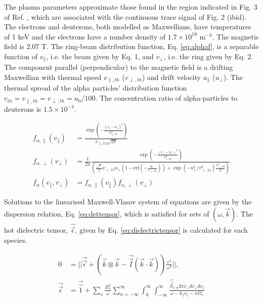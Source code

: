 \documentclass[12pt]{iopart}
\begin{document}
The plasma parameters approximate those found in the region indicated in Fig. 3 of Ref. \cite{Cottrell1993}, which are associated with the continuous trace signal of Fig. 2 (ibid). The electrons and deuterons, both modelled as Maxwellians, have temperatures of 1 keV and the electrons have a number density of $1.7\times 10^{19}$ $\mathrm{m^{-3}}$. The magnetic field is $2.07$ $\mathrm{T}$.
The ring-beam distribution function, Eq. \ref{eq:alphaf}, is a separable function of $v_\parallel$, i.e. the beam given by Eq. 1, and $v_\perp$, i.e. the ring given by Eq. 2. The component parallel (perpendicular) to the magnetic field is a drifting Maxwellian with thermal speed $v_{\parallel, th}$ ($v_{\perp, th}$) and drift velocity $u_\parallel$ ($u_\perp$). The thermal spread of the alpha particles' distribution function $v_{th}=v_{\parallel,th}=v_{\perp,th}=u_0/100$. The concentration ratio of alpha-particles to deuterons is $1.5\times10^{-4}$.

\begin{align}
f_{\alpha,\parallel}\left(v_\parallel\right) &= \frac{\exp\left(-\frac{(v_\parallel - u_\parallel)^2}{v_{\parallel,th}^2}\right)}{v_{\parallel,th} \sqrt{2 \pi}}\\
f_{\alpha,\perp}\left(v_\perp\right) &= \frac{1}{2\pi}\frac{\exp\left(-\frac{\left(v_\bot - u_\bot\right)^2}{v_{\bot,th}^2}\right)}{\left(\frac{\sqrt \pi}{2} v_{\perp, th} u_\bot (1 - \mathrm{erf}(-\frac{u_\bot}{v_{\perp,th}})) + \exp(-u_\bot^2 / v_{\perp, th}^2) \frac{v_{\perp,th}^2}{2}\right)}\\
f_\alpha\left(v_\parallel, v_\perp\right) &= f_{\alpha,\parallel}\left(v_\parallel\right)f_{\alpha,\perp}\left(v_\perp\right)
    \label{eq:alphaf}
\end{align}

Solutions to the linearised Maxwell-Vlasov system of equations are given by the dispersion relation, Eq. \ref{eq:dettensor}, which is satisfied for sets of $(\omega,\vec{k})$. The hot dielectric tensor\cite{Stix}, $\vec{\vec{\epsilon}}$,  given by Eq. \ref{eq:dielectrictensor} is calculated for each species.

\begin{align}
    0 &= ||\vec{\vec{\epsilon}} + \left(\vec{k} \otimes \vec{k} - \vec{\vec{I}}(\vec{k}\cdot\vec{k})\right) \frac{c^2}{\omega^2}||,\label{eq:dettensor}\\
    \vec{\vec{\epsilon}} &= \vec{\vec{1}} + \sum_s \frac{\Pi_s^2}{\omega}\sum_{n=-\infty}^{\infty}
    \int_0^{\infty}
    \int_{-\infty}^{\infty}\frac{\vec{\vec{S}}_{s,n} 2\pi v_\perp dv_\perp dv_\parallel}{\omega - k_\parallel v_\parallel - n \Omega_s}
    \label{eq:dielectrictensor}
\end{align}
\end{document}
